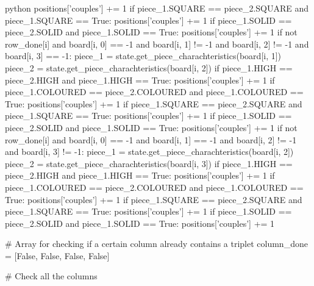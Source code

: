 \begin{mintedbox}{python}
                positions['couples'] += 1
            if piece_1.SQUARE == piece_2.SQUARE and piece_1.SQUARE == True:
                positions['couples'] += 1
            if piece_1.SOLID == piece_2.SOLID and piece_1.SOLID == True:
                positions['couples'] += 1
        if not row_done[i] and board[i, 0] == -1 and board[i, 1] != -1 and board[i, 2] != -1 and board[i, 3] == -1:
            piece_1 = state.get_piece_charachteristics(board[i, 1])
            piece_2 = state.get_piece_charachteristics(board[i, 2])
            if piece_1.HIGH == piece_2.HIGH and piece_1.HIGH == True:
                positions['couples'] += 1
            if piece_1.COLOURED == piece_2.COLOURED and piece_1.COLOURED == True:
                positions['couples'] += 1
            if piece_1.SQUARE == piece_2.SQUARE and piece_1.SQUARE == True:
                positions['couples'] += 1
            if piece_1.SOLID == piece_2.SOLID and piece_1.SOLID == True:
                positions['couples'] += 1
        if not row_done[i] and board[i, 0] == -1 and board[i, 1] == -1 and board[i, 2] != -1 and board[i, 3] != -1:
            piece_1 = state.get_piece_charachteristics(board[i, 2])
            piece_2 = state.get_piece_charachteristics(board[i, 3])
            if piece_1.HIGH == piece_2.HIGH and piece_1.HIGH == True:
                positions['couples'] += 1
            if piece_1.COLOURED == piece_2.COLOURED and piece_1.COLOURED == True:
                positions['couples'] += 1
            if piece_1.SQUARE == piece_2.SQUARE and piece_1.SQUARE == True:
                positions['couples'] += 1
            if piece_1.SOLID == piece_2.SOLID and piece_1.SOLID == True:
                positions['couples'] += 1

    # Array for checking if a certain column already contains a triplet
    column_done = [False, False, False, False]

    # Check all the columns


\end{mintedbox}
